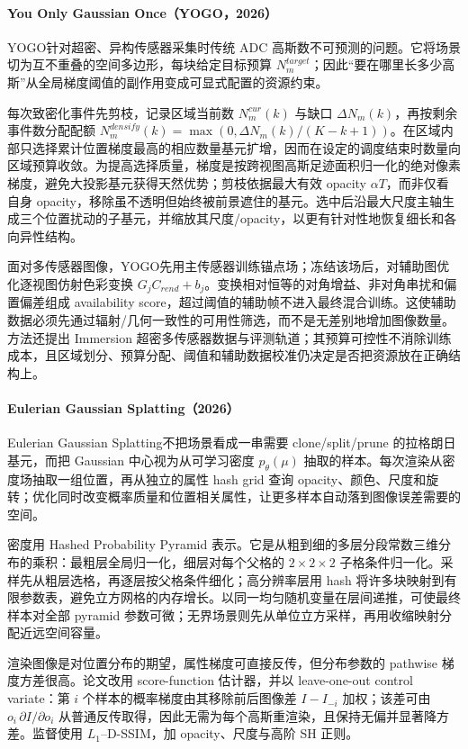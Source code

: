 \paragraph{You Only Gaussian Once（YOGO，2026）\cite{2604_21400}}
YOGO针对超密、异构传感器采集时传统 ADC 高斯数不可预测的问题。它将场景切为互不重叠的空间多边形，每块给定目标预算 $N_m^{target}$；因此“要在哪里长多少高斯”从全局梯度阈值的副作用变成可显式配置的资源约束。

每次致密化事件先剪枝，记录区域当前数 $N_m^{cur}(k)$ 与缺口 $\Delta N_m(k)$，再按剩余事件数分配配额 $N_m^{densify}(k)=\max(0,\Delta N_m(k)/(K-k+1))$。在区域内部只选择累计位置梯度最高的相应数量基元扩增，因而在设定的调度结束时数量向区域预算收敛。为提高选择质量，梯度是按跨视图高斯足迹面积归一化的绝对像素梯度，避免大投影基元获得天然优势；剪枝依据最大有效 opacity $\alpha T$，而非仅看自身 opacity，移除虽不透明但始终被前景遮住的基元。选中后沿最大尺度主轴生成三个位置扰动的子基元，并缩放其尺度/opacity，以更有针对性地恢复细长和各向异性结构。

面对多传感器图像，YOGO先用主传感器训练锚点场；冻结该场后，对辅助图优化逐视图仿射色彩变换 $G_jC_{rend}+b_j$。变换相对恒等的对角增益、非对角串扰和偏置偏差组成 availability score，超过阈值的辅助帧不进入最终混合训练。这使辅助数据必须先通过辐射/几何一致性的可用性筛选，而不是无差别地增加图像数量。方法还提出 Immersion 超密多传感器数据与评测轨道；其预算可控性不消除训练成本，且区域划分、预算分配、阈值和辅助数据校准仍决定是否把资源放在正确结构上。

\paragraph{Eulerian Gaussian Splatting（2026）\cite{2605_29136}}
Eulerian Gaussian Splatting不把场景看成一串需要 clone/split/prune 的拉格朗日基元，而把 Gaussian 中心视为从可学习密度 $p_\theta(\mu)$ 抽取的样本。每次渲染从密度场抽取一组位置，再从独立的属性 hash grid 查询 opacity、颜色、尺度和旋转；优化同时改变概率质量和位置相关属性，让更多样本自动落到图像误差需要的空间。

密度用 Hashed Probability Pyramid 表示。它是从粗到细的多层分段常数三维分布的乘积：最粗层全局归一化，细层对每个父格的 $2\times2\times2$ 子格条件归一化。采样先从粗层选格，再逐层按父格条件细化；高分辨率层用 hash 将许多块映射到有限参数表，避免立方网格的内存增长。以同一均匀随机变量在层间递推，可使最终样本对全部 pyramid 参数可微；无界场景则先从单位立方采样，再用收缩映射分配近远空间容量。

渲染图像是对位置分布的期望，属性梯度可直接反传，但分布参数的 pathwise 梯度方差很高。论文改用 score-function 估计器，并以 leave-one-out control variate：第 $i$ 个样本的概率梯度由其移除前后图像差 $I-I_{-i}$ 加权；该差可由 $o_i\,\partial I/\partial o_i$ 从普通反传取得，因此无需为每个高斯重渲染，且保持无偏并显著降方差。监督使用 $L_1$--D-SSIM，加 opacity、尺度与高阶 SH 正则。

